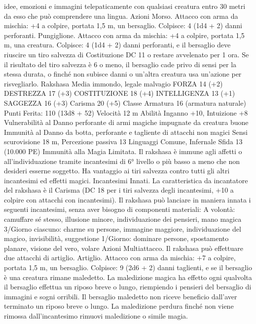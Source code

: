 \begin{multicols}{2}
idee, emozioni e immagini telepaticamente con qualsiasi creatura
entro 30 metri da esso che può comprendere una lingua.
Azioni
Morso. Attacco con arma da mischia: +4 a colpire, portata 1,5
m, un bersaglio.
Colpisce: 4 (1d4 + 2) danni perforanti.
Pungiglione. Attacco con arma da mischia: +4 a colpire, portata
1,5 m, una creatura.
Colpisce: 4 (1d4 + 2) danni perforanti, e il bersaglio deve
riuscire un tiro salvezza di Costituzione DC 11 o restare
avvelenato per 1 ora. Se il risultato del tiro salvezza è 6 o meno,
il bersaglio cade privo di sensi per la stessa durata, o finché non
subisce danni o un’altra creatura usa un’azione per risvegliarlo.
Rakshasa
Media immondo, legale malvagio
FORZA 14 (+2)
DESTREZZA 17 (+3)
COSTITUZIONE 18 (+4)
INTELLIGENZA 13 (+1)
SAGGEZZA 16 (+3)
Carisma 20 (+5)
Classe Armatura 16 (armatura naturale)
\hspace*{0pt}\hfill{Punti Ferita}: 110 (13d8 + 52)
Velocità 12 m
Abilità Inganno +10, Intuizione +8
Vulnerabilità al Danno perforante di armi magiche impugnate
da creatura buone
Immunità al Danno da botta, perforante e tagliente di
attacchi non magici
Sensi scurovisione 18 m, Percezione passiva 13
Linguaggi Comune, Infernale
Sfida 13 (10.000 PE)
Immunità alla Magia Limitata. Il rakshasa è immune agli affetti
o all’individuazione tramite incantesimi di 6° livello o più basso
a meno che non desideri esserne soggetto. Ha vantaggio ai tiri
salvezza contro tutti gli altri incantesimi ed effetti magici.
Incantesimi Innati. La caratteristica da incantatore del rakshasa
è il Carisma (DC 18 per i tiri salvezza degli incantesimi, +10 a
colpire con attacchi con incantesimi). Il rakshasa può lanciare in
maniera innata i seguenti incantesimi, senza aver bisogno di
componenti materiali:
A volontà: camuffare sé stesso, illusione minore, individuazione
dei pensieri, mano magica
3/Giorno ciascuno: charme su persone, immagine maggiore,
individuazione del magico, invisibilità, suggestione
1/Giorno: dominare persone, spostamento planare, visione del
vero, volare
Azioni
Multiattacco. Il rakshasa può effettuare due attacchi di artiglio.
Artiglio. Attacco con arma da mischia: +7 a colpire, portata 1,5
m, un bersaglio.
Colpisce: 9 (2d6 + 2) danni taglienti, e se il bersaglio è una
creatura rimane maledetto. La maledizione magica ha effetto
ogni qualvolta il bersaglio effettua un riposo breve o lungo,
riempiendo i pensieri del bersaglio di immagini e sogni orribili.
Il bersaglio maledetto non riceve beneficio dall’aver terminato
un riposo breve o lungo. La maledizione perdura finché non
viene rimossa dall’incantesimo rimuovi maledizione o simile
magia.
 

\end{multicols}
